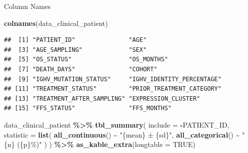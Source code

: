 \documentclass[
]{article}
\newenvironment{Shaded}{\begin{snugshade}}{\end{snugshade}}
\newcommand{\AttributeTok}[1]{\textcolor[rgb]{0.13,0.29,0.53}{#1}}
\newcommand{\ConstantTok}[1]{\textcolor[rgb]{0.56,0.35,0.01}{#1}}
\newcommand{\FunctionTok}[1]{\textcolor[rgb]{0.13,0.29,0.53}{\textbf{#1}}}
\newcommand{\NormalTok}[1]{#1}
\newcommand{\SpecialCharTok}[1]{\textcolor[rgb]{0.81,0.36,0.00}{\textbf{#1}}}
\newcommand{\StringTok}[1]{\textcolor[rgb]{0.31,0.60,0.02}{#1}}
\begin{document}
Column Names

\begin{Shaded}
\begin{Highlighting}[]
\FunctionTok{colnames}\NormalTok{(data\_clinical\_patient)}
\end{Highlighting}
\end{Shaded}

\begin{verbatim}
##  [1] "PATIENT_ID"               "AGE"                     
##  [3] "AGE_SAMPLING"             "SEX"                     
##  [5] "OS_STATUS"                "OS_MONTHS"               
##  [7] "DEATH_DAYS"               "COHORT"                  
##  [9] "IGHV_MUTATION_STATUS"     "IGHV_IDENTITY_PERCENTAGE"
## [11] "TREATMENT_STATUS"         "PRIOR_TREATMENT_CATEGORY"
## [13] "TREATMENT_AFTER_SAMPLING" "EXPRESSION_CLUSTER"      
## [15] "FFS_STATUS"               "FFS_MONTHS"
\end{verbatim}

\begin{Shaded}
\begin{Highlighting}[]
\NormalTok{data\_clinical\_patient }\SpecialCharTok{\%\textgreater{}\%} 
  \FunctionTok{tbl\_summary}\NormalTok{(}
    \AttributeTok{include =} \SpecialCharTok{{-}}\NormalTok{PATIENT\_ID,}
    \AttributeTok{statistic =} \FunctionTok{list}\NormalTok{(}
     \FunctionTok{all\_continuous}\NormalTok{() }\SpecialCharTok{\textasciitilde{}} \StringTok{"\{mean\} ± \{sd\}"}\NormalTok{,}
      \FunctionTok{all\_categorical}\NormalTok{() }\SpecialCharTok{\textasciitilde{}} \StringTok{"\{n\} (\{p\}\%)"}
\NormalTok{    )}
\NormalTok{  ) }\SpecialCharTok{\%\textgreater{}\%} 
  \FunctionTok{as\_kable\_extra}\NormalTok{(}\AttributeTok{longtable =} \ConstantTok{TRUE}\NormalTok{)}
\end{Highlighting}
\end{Shaded}
\end{document}
